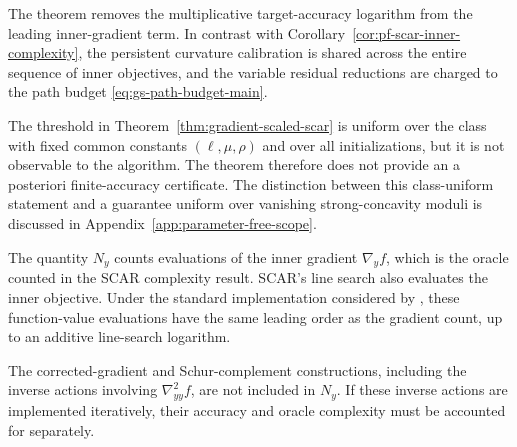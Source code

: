 The theorem removes the multiplicative target-accuracy logarithm from
the leading inner-gradient term. In contrast with
Corollary~\ref{cor:pf-scar-inner-complexity}, the persistent
curvature calibration is shared across the entire sequence of inner
objectives, and the variable residual reductions are charged to the
path budget \eqref{eq:gs-path-budget-main}.

\begin{remark}
\label{rem:pf-scope}
The threshold in
Theorem~\ref{thm:gradient-scaled-scar} is uniform over the class with
fixed common constants $(\ell,\mu,\rho)$ and over all
initializations, but it is not observable to the algorithm.
The theorem therefore does not provide an a posteriori
finite-accuracy certificate.
The distinction between this class-uniform statement and a guarantee
uniform over vanishing strong-concavity moduli is discussed in
Appendix~\ref{app:parameter-free-scope}.
\end{remark}

\begin{remark}
\label{rem:pf-oracle-accounting}
The quantity $N_y$ counts evaluations of the inner gradient
$\nabla_yf$, which is the oracle counted in the SCAR complexity
result. SCAR's line search also evaluates the inner objective.
Under the standard implementation considered by
\citet{lan2026optimal}, these function-value evaluations have the
same leading order as the gradient count, up to an additive
line-search logarithm.

The corrected-gradient and Schur-complement constructions, including
the inverse actions involving $\nabla^2_{yy}f$, are not included in
$N_y$. If these inverse actions are implemented iteratively, their
accuracy and oracle complexity must be accounted for separately.
\end{remark}